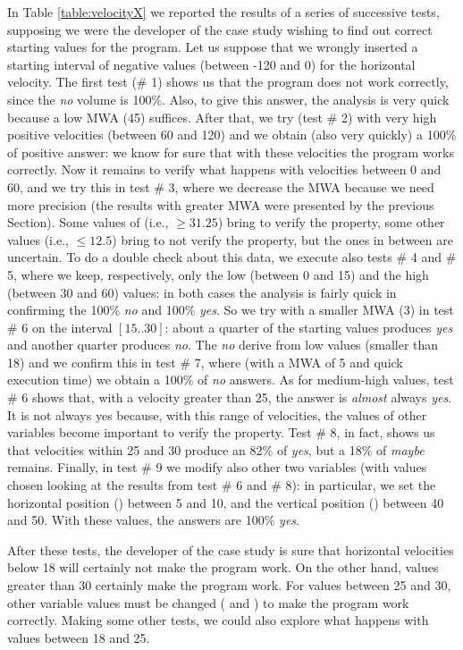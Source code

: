 In Table \ref{table:velocityX} we reported the results of a series of successive tests, supposing we were the developer of the case study wishing to find out correct starting values for the program. Let us suppose that we wrongly inserted a starting interval of negative values (between -120 and 0) for the horizontal velocity. The first test (\# 1) shows us that the program does not work correctly, since the \emph{no} volume is 100\%. Also, to give this answer, the analysis is very quick because a low MWA (45) suffices. After that, we try (test \# 2) with very high positive velocities (between 60 and 120) and we obtain (also very quickly) a 100\% of positive answer: we know for sure that with these velocities the program works correctly. Now it remains to verify what happens with velocities between 0 and 60, and we try this in test \# 3, where we decrease the MWA because we need more precision (the results with greater MWA were presented by the previous Section). Some values of  (i.e., $\geq 31.25$) bring to verify the property, some other values (i.e., $\leq 12.5$) bring to not verify the property, but the ones in between are uncertain. To do a double check about this data, we execute also tests \# 4 and \# 5, where we keep, respectively, only the low (between 0 and 15) and the high (between 30 and 60) values: in both cases the analysis is fairly quick in confirming the 100\% \emph{no} and 100\% \emph{yes}. So we try with a smaller MWA (3) in test \# 6 on the interval $[15..30]$: about a quarter of the starting values produces \emph{yes} and another quarter produces \emph{no}. The \emph{no} derive from low values (smaller than 18) and we confirm this in test \# 7, where (with a MWA of 5 and quick execution time) we obtain a 100\% of \emph{no} answers. As for medium-high values, test \# 6 shows that, with a velocity greater than 25, the answer is \emph{almost} always \emph{yes}. It is not always yes because, with this range of velocities, the values of other variables become important to verify the property. Test \# 8, in fact, shows us that velocities within 25 and 30 produce an 82\% of \emph{yes}, but a 18\% of \emph{maybe} remains. Finally, in test \# 9 we modify also other two variables (with values chosen looking at the results from test \# 6 and \# 8): in particular, we set the horizontal position () between 5 and 10, and the vertical position () between 40 and 50. With these values, the answers are 100\% \emph{yes}. 

After these tests, the developer of the case study is sure that horizontal velocities below 18 will certainly not make the program work. On the other hand, values greater than 30 certainly make the program work. For values between 25 and 30, other variable values must be changed ( and ) to make the program work correctly. Making some other tests, we could also explore what happens with values between 18 and 25. 

